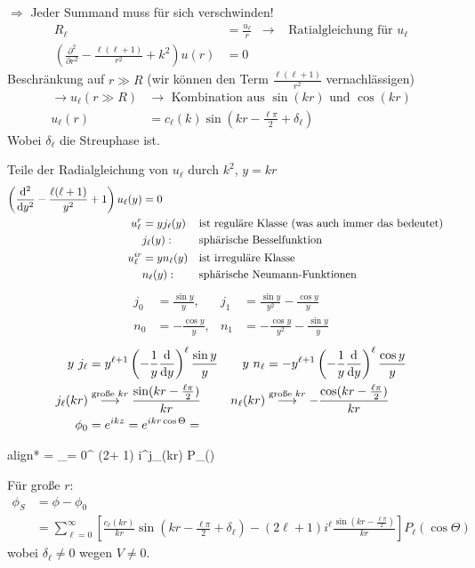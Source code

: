 	$\Rightarrow$ Jeder Summand muss für sich verschwinden!
		\begin{align*}
			R_\ell &= \frac{u_\ell}{r} &\rightarrow &\text{ Ratialgleichung für } u_\ell \\
			\left( \frac{\partial^2}{\partial r^2} - \frac{\ell(\ell+1)}{r^2} + k^2
			\right) u(r) &= 0
		\end{align*}
	Beschränkung auf $r\gg R$ (wir können den Term $\frac{\ell(\ell+1)}{r^2}$ vernachlässigen)
		\begin{align*}
			\rightarrow u_\ell(r \gg R) &\rightarrow \text{ Kombination aus } \sin (kr) \text{ und } \cos(kr) \\
			u_\ell(r) &= c_\ell (k) \sin \left( kr - \frac{\ell \pi}{2} + \delta_\ell \right)
		\end{align*}
	Wobei $\delta_\ell$ die Streuphase ist. 
	
	Teile der Radialgleichung von $u_\ell$ durch $k^2$, $y=kr$ 
		\begin{align*}
			\left( \frac{\mathrm{d}^2}{\mathrm{d} y^2} - \frac{\ell(\ell+1)}{y^2} + 1
			\right) u_\ell (y) &= 0 \\
			u_\ell^r &= y j_\ell (y) & & \text{ist reguläre Klasse (was auch immer das bedeutet)} \\
			&j_\ell (y) : & &\text{sphärische Besselfunktion} \\
			u_\ell^{ir} &= y n_\ell(y) & &\text{ist irreguläre Klasse}\\
			&n_\ell(y) : & &\text{sphärische Neumann-Funktionen}
		\end{align*}
		\begin{align*}
			j_0 &= \frac{\sin y}{y} ,& j_1 &= \frac{\sin y}{y^2}- \frac{\cos y}{y} \\
			n_0 &= -\frac{\cos y}{y} ,& n_1 &= -\frac{\cos y}{y^2} - \frac{\sin y}{y}
		\end{align*}
		\begin{align*}
			y ~j_\ell &= y^{\ell + 1} \left(-\frac{1}{y} \frac{\mathrm{d}}{\mathrm{d} y}\right)^\ell 
			\frac{\sin y}{y} &
			y ~n_\ell &= - y^{\ell+1} \left(-\frac{1}{y} \frac{\mathrm{d}}{\mathrm{d} y}\right)^\ell
			\frac{\cos y}{y}\\
			j_\ell(kr) &\overset{\text{große }kr}{\longrightarrow} 
			\frac{\sin(kr-\frac{\ell \pi}{2})}{kr} &
			n_\ell(kr) &\overset{\text{große }kr}{\longrightarrow} 
			- \frac{\cos(kr-\frac{\ell \pi}{2})}{kr} \\
			\phi_0 &= e^{ikz} = e^{ikr \cos \Theta} =
		\end{align*}
		\begin{empheq}[box=\boxed]{align*}
			= \sum_{\ell = 0}^{\infty} (2\ell + 1) i^\ell j_\ell(kr) P_\ell (\cos \Theta)
		\end{empheq}
	Für große $r$:
		\begin{align*}	
			\phi_S &= \phi - \phi_0 \\
			&= \sum_{\ell = 0}^{\infty} 
			\left[ \frac{c_\ell(kr)}{kr} \sin \left(kr-\frac{\ell \pi}{2} + \delta_\ell \right)
				-(2\ell +1)i^\ell \frac{\sin \left(kr-\frac{\ell \pi}{2}\right)}{kr}
			\right] P_\ell (\cos \Theta)
		\end{align*}
	wobei $\delta_\ell \neq 0$ wegen $V \neq 0$.
	
